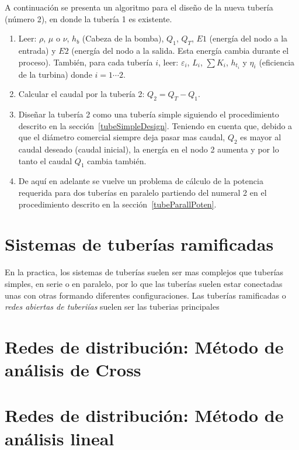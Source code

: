 \documentclass[10pt, oneside]{article}
\begin{document}
A continuaci\'on se presenta un algoritmo para el dise\~no de la nueva tuber\'ia (n\'umero 2), en donde la tuber\'ia 1 es existente.

\begin{enumerate}
\item Leer: $\rho$, $\mu$ o $\nu$, $h_b$ (Cabeza de la bomba), $Q_1$, $Q_T$, $E1$ (energ\'ia del nodo a la entrada) y $E2$ (energ\'ia del nodo a la salida. Esta energ\'ia cambia durante el proceso). Tambi\'en, para cada tuber\'ia $i$, leer: $\varepsilon_i$, $L_i$, $\sum K_i$, $h_{t_i}$ y $\eta_i$ (eficiencia de la turbina) donde $i=1 \cdots 2$.
\item Calcular el caudal por la tuber\'ia 2: $Q_2 = Q_T - Q_1$.
\item Dise\~nar la tuber\'ia 2 como una tuber\'ia simple siguiendo el procedimiento descrito en la secci\'on~\ref{tubeSimpleDesign}. Teniendo en cuenta que, debido a que el di\'ametro comercial siempre deja pasar mas caudal, $Q_2$ es mayor al caudal deseado (caudal inicial), la energ\'ia en el nodo 2 aumenta y por lo tanto el caudal $Q_1$ cambia tambi\'en.
\item De aqu\'i en adelante se vuelve un problema de c\'alculo de la potencia requerida para dos tuber\'ias en paralelo partiendo del numeral 2 en el procedimiento descrito en la secci\'on~\ref{tubeParallPoten}. 
\end{enumerate}

\section{Sistemas de tuber\'ias ramificadas} 
En la practica, los sistemas de tuber\'ias suelen ser mas complejos que tuber\'ias simples, en serie o en paralelo, por lo que las tuber\'ias suelen estar conectadas unas con otras formando diferentes configuraciones. Las tuber\'ias ramificadas o \emph{redes abiertas de tuberi\'ias} suelen ser las tuberias principales 

\section{Redes de distribuci\'on: M\'etodo de an\'alisis de Cross}

\section{Redes de distribuci\'on: M\'etodo de an\'alisis lineal}




\end{document}
